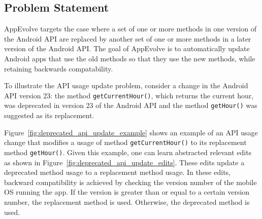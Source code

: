 
\subsection{Problem Statement}\label{sec:problem}

AppEvolve targets the case where a set of one or more methods in one
version of the Android API are replaced by another set of one or more
methods in a later version of the Android API.  The goal of AppEvolve is to
automatically update Android apps that use the old methods so that they use
the new methods, while retaining backwards compatability.


To illustrate the API usage update problem, consider a change in the
Android API version 23: the method \texttt{getCurrentHour()}, which returns
the current hour, was deprecated in version 23 of the Android API and the
method \texttt{getHour()} was suggested as its replacement.

Figure~\ref{fig:deprecated_api_update_example} shows an example of an API
usage change that modifies a usage of method \texttt{getCurrentHour()} to
its replacement method \texttt{getHour()}. Given this example, one can
learn abstracted relevant edits as shown in
Figure~\ref{fig:deprecated_api_update_edits}. These edits update a
deprecated method usage to a replacement method usage. In these edits,
backward compatibility is achieved by checking the version number of the
mobile OS running the app. If the version is greater than or equal to a
certain version number, the replacement method is used. Otherwise, the
deprecated method is used.

